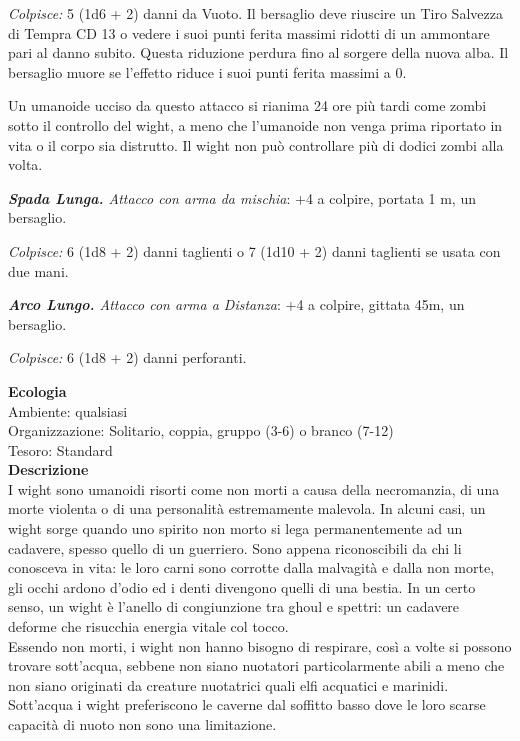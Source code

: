 \begin{multicols}{2}
\emph{Colpisce:} 5 (1d6 + 2) danni da Vuoto. Il bersaglio deve riuscire un Tiro Salvezza di Tempra CD 13 o vedere i suoi punti ferita massimi ridotti di un ammontare pari al danno subito. Questa riduzione perdura fino al sorgere della nuova alba. Il bersaglio muore se l'effetto riduce i suoi punti ferita massimi a 0.

Un umanoide ucciso da questo attacco si rianima 24 ore più tardi come zombi sotto il controllo del wight, a meno che l'umanoide non venga prima riportato in vita o il corpo sia distrutto. Il wight non può controllare più di dodici zombi alla volta.

\emph{\textbf{Spada Lunga.} Attacco con arma da mischia}: +4 a colpire, portata 1 m, un bersaglio.

\emph{Colpisce:} 6 (1d8 + 2) danni taglienti o 7 (1d10 + 2) danni taglienti se usata con due mani.

\emph{\textbf{Arco Lungo.} Attacco con arma a Distanza}: +4 a colpire, gittata 45m, un bersaglio.

\emph{Colpisce:} 6 (1d8 + 2) danni perforanti.

\textbf{Ecologia}\\
Ambiente: qualsiasi\\
Organizzazione: Solitario, coppia, gruppo (3-6) o branco (7-12)\\
Tesoro: Standard\\
\textbf{Descrizione}\\
I wight sono umanoidi risorti come non morti a causa della necromanzia, di una morte violenta o di una personalità estremamente malevola. In alcuni casi, un wight sorge quando uno spirito non morto si lega permanentemente ad un cadavere, spesso quello di un guerriero. Sono appena riconoscibili da chi li conosceva in vita: le loro carni sono corrotte dalla malvagità e dalla non morte, gli occhi ardono d'odio ed i denti divengono quelli di una bestia. In un certo senso, un wight è l'anello di congiunzione tra ghoul e spettri: un cadavere deforme che risucchia energia vitale col tocco.\\

Essendo non morti, i wight non hanno bisogno di respirare, così a volte si possono trovare sott'acqua, sebbene non siano nuotatori particolarmente abili a meno che non siano originati da creature nuotatrici quali elfi acquatici e marinidi. Sott'acqua i wight preferiscono le caverne dal soffitto basso dove le loro scarse capacità di nuoto non sono una limitazione.\\



\end{multicols}
